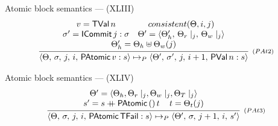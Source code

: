\documentclass[14pt]{beamer}
\newcommand{\plus}{\mathbin{+\!\!\!+}}
\newcommand{\C}[1]{\red{\mathsf{#1}}}
\begin{document}
     \begin{frame}{Atomic block semantics --- (XLIII)}
\begingroup
\everymath{\scriptstyle}
\large
\[
  \begin{array}{c}
     \infer[_{(PAt2)}]
           {\langle \Theta,\,\sigma,\,j,\,i,\,\ensuremath{\C{PAtomic}}\,v : s \rangle \mapsto_{P}
            \langle \Theta',\,\sigma',\,j,\,i + 1,\,\ensuremath{\C{PVal}}\,n : s \rangle}
           {\begin{array}{cc}
              v = \ensuremath{\C{TVal}}\, n         & consistent(\Theta,i,j) \\
              \sigma' = \ensuremath{\C{ICommit}}\,j : \sigma & 
              \Theta' = \langle \Theta_h',\,\Theta_r\mid_j,\,\Theta_w\mid_j \rangle \\
              \multicolumn{2}{c}{\Theta_h'  = \Theta_h \uplus \Theta_w(j)} \\
            \end{array}}
  \end{array}
\]
\endgroup
     \end{frame}
     \begin{frame}{Atomic block semantics --- (XLIV)}
\begingroup
\everymath{\scriptstyle}
\Large
\[
  \begin{array}{c}
     \infer[_{(PAt3)}]
           {\langle \Theta,\,\sigma,\,j,\,i,\,\ensuremath{\C{PAtomic}}\,\ensuremath{\C{TFail}} : s \rangle \mapsto_{P}
            \langle \Theta',\,\sigma,\,j + 1,\,i,\,s' \rangle}
           {\begin{array}{c}
              \Theta' = \langle\Theta_h,\Theta_r\mid_j,\Theta_w\mid_j,\Theta_T\mid_j\rangle\\
              s' = s \ensuremath{\plus } \ensuremath{\C{PAtomic}}\,()\,t\,\,\,\,\,\,\,t = \Theta_t(j)
            \end{array}}
  \end{array}
\]
\endgroup
     \end{frame}
\end{document}
